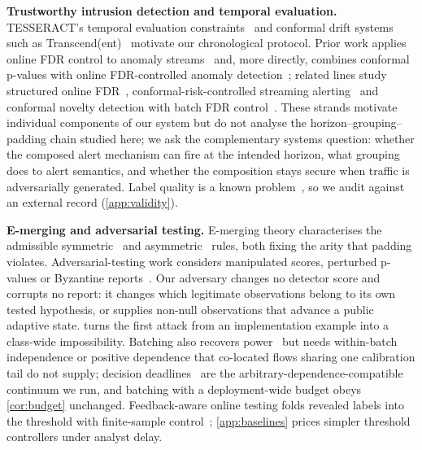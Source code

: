 \documentclass[conference]{IEEEtran}
\begin{document}
\textbf{Trustworthy intrusion detection and temporal evaluation.} TESSERACT's temporal evaluation
constraints~\cite{pendlebury2019tesseract} and conformal drift systems such as
Transcend(ent)~\cite{jordaney2017transcend,barbero2022transcendent} motivate our chronological protocol.
Prior work applies online FDR control to anomaly streams~\cite{rebjock2021online} and, more directly,
combines conformal p-values with online FDR-controlled anomaly detection~\cite{farzaneh2025coad};
related lines study structured online FDR~\cite{wang2025multilayer}, conformal-risk-controlled
streaming alerting~\cite{caliburn2026} and conformal novelty detection with batch FDR
control~\cite{gao2026boundary}. These strands motivate individual components of our system but do not
analyse the horizon--grouping--padding chain studied here; we ask the complementary systems question: whether the
composed alert mechanism can fire at the intended horizon, what grouping does to alert semantics, and
whether the composition stays secure when traffic is adversarially generated. Label quality is a known
problem~\cite{engelen2021troubleshooting,liu2022error}, so we audit against an external record
(\cref{app:validity}).

\textbf{E-merging and adversarial testing.} E-merging theory characterises the admissible
symmetric~\cite{vovk2021evalues} and asymmetric~\cite{wang2025admissible} rules, both fixing the arity
that padding violates. Adversarial-testing work considers manipulated scores, perturbed p-values or
Byzantine reports~\cite{yasodharan2019nonzero,chen2024adversarialbh,zhang2025conformalevasion,zhang2025byzantine}.
Our adversary changes no detector score and corrupts no report: it changes which legitimate observations
belong to its own tested hypothesis, or supplies non-null observations that advance a public adaptive
state.  turns the first attack from an implementation example into a class-wide
impossibility. Batching also recovers power~\cite{zrnic2020batching} but needs within-batch independence or positive
dependence that co-located flows sharing
one calibration tail do not supply; decision deadlines~\cite{fisher2022deadlines,xu2026eclosure} are the
arbitrary-dependence-compatible continuum we run, and batching with a deployment-wide budget obeys
\cref{cor:budget} unchanged. Feedback-aware online testing folds revealed labels into the threshold with
finite-sample control~\cite{lu2026gaif,liu2025ocsarc}; \cref{app:baselines} prices simpler threshold
controllers under analyst delay.

\end{document}
